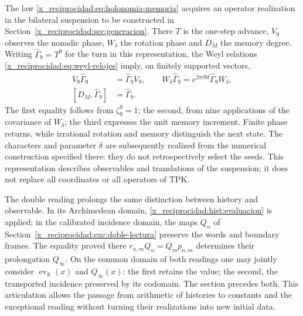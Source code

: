 The law \eqref{x_reciprocidad:eq:holonomia-memoria} acquires an operator realization
in the bilateral suspension to be constructed in
Section~\ref{x_reciprocidad:sec:generacion}. There \(T\) is the one-step advance,
\(V_9\) observes the nonadic phase, \(W_\delta\) the rotation phase and
\(D_M\) the memory degree. Writing
\(\widehat\Gamma_9=T^9\) for the turn in this representation,
the Weyl relations \eqref{x_reciprocidad:eq:weyl-relojes} imply, on finitely supported
vectors,
\begin{equation}
 \begin{aligned}
 V_9\widehat\Gamma_9&=\widehat\Gamma_9V_9,\qquad
 W_\delta\widehat\Gamma_9=e^{2\pi i9\delta}
     \widehat\Gamma_9W_\delta,\\
 [D_M,\widehat\Gamma_9]&=\widehat\Gamma_9.
 \end{aligned}
 \label{x_reciprocidad:hist:tres-retornos}
\end{equation}
The first equality follows from \(\zeta_9^9=1\); the second, from nine
applications of the covariance of \(W_\delta\); the third expresses
the unit memory increment. Finite phase returns, while
irrational rotation and memory distinguish the next state. The
characters and parameter \(\delta\) are subsequently realized from the
numerical construction specified there: they do not retrospectively select
the seeds. This representation describes observables and translations of
the suspension; it does not replace all coordinates or all operators
of TPK.

The double reading prolongs the same distinction between history and observable.
In its Archimedean domain, \eqref{x_reciprocidad:hist:evaluacion} is applied; in the
calibrated incidence domain, the maps \(Q_n\) of
Section~\ref{x_reciprocidad:exc:doble-lectura} preserve the words and boundary
frames. The equality proved there
\(r_{n,m}Q_n=Q_mp_{n,m}\) determines their prolongation \(Q_\infty\).
On the common domain of both readings one may jointly consider
\(\operatorname{ev}_{\mathbb R}(x)\) and \(Q_\infty(x)\): the
first retains the value; the second, the transported incidence preserved by its
codomain. The section precedes both. This articulation allows the passage
from arithmetic of histories to constants and the exceptional
reading without turning their realizations into new initial data.


